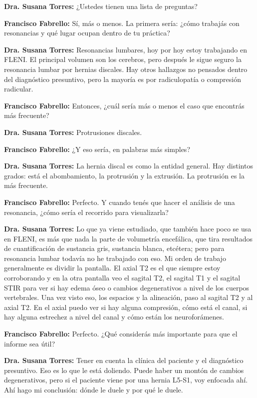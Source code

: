 \noindent\textbf{Dra. Susana Torres:} ¿Ustedes tienen una lista de preguntas?

\noindent\textbf{Francisco Fabrello:} Sí, más o menos. La primera sería: ¿cómo trabajás con resonancias y qué lugar ocupan dentro de tu práctica?

\noindent\textbf{Dra. Susana Torres:} Resonancias lumbares, hoy por hoy estoy trabajando en FLENI. El principal volumen son los cerebros, pero después le sigue seguro la resonancia lumbar por hernias discales. Hay otros hallazgos no pensados dentro del diagnóstico presuntivo, pero la mayoría es por radiculopatía o compresión radicular.

\noindent\textbf{Francisco Fabrello:} Entonces, ¿cuál sería más o menos el caso que encontrás más frecuente?

\noindent\textbf{Dra. Susana Torres:} Protrusiones discales.

\noindent\textbf{Francisco Fabrello:} ¿Y eso sería, en palabras más simples?

\noindent\textbf{Dra. Susana Torres:} La hernia discal es como la entidad general. Hay distintos grados: está el abombamiento, la protrusión y la extrusión. La protrusión es la más frecuente.

\noindent\textbf{Francisco Fabrello:} Perfecto. Y cuando tenés que hacer el análisis de una resonancia, ¿cómo sería el recorrido para visualizarla?

\noindent\textbf{Dra. Susana Torres:} Lo que ya viene estudiado, que también hace poco se usa en FLENI, es más que nada la parte de volumetría encefálica, que tira resultados de cuantificación de sustancia gris, sustancia blanca, etcétera; pero para resonancia lumbar todavía no he trabajado con eso. Mi orden de trabajo generalmente es dividir la pantalla. El axial T2 es el que siempre estoy corroborando y en la otra pantalla veo el sagital T2, el sagital T1 y el sagital STIR para ver si hay edema óseo o cambios degenerativos a nivel de los cuerpos vertebrales. Una vez visto eso, los espacios y la alineación, paso al sagital T2 y al axial T2. En el axial puedo ver si hay alguna compresión, cómo está el canal, si hay alguna estrechez a nivel del canal y cómo están los neuroforámenes.

\noindent\textbf{Francisco Fabrello:} Perfecto. ¿Qué considerás más importante para que el informe sea útil?

\noindent\textbf{Dra. Susana Torres:} Tener en cuenta la clínica del paciente y el diagnóstico presuntivo. Eso es lo que le está doliendo. Puede haber un montón de cambios degenerativos, pero si el paciente viene por una hernia L5-S1, voy enfocada ahí. Ahí hago mi conclusión: dónde le duele y por qué le duele.

